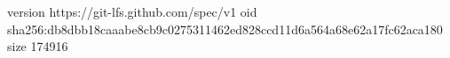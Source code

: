 version https://git-lfs.github.com/spec/v1
oid sha256:db8dbb18caaabe8cb9c0275311462ed828ccd11d6a564a68e62a17fc62aca180
size 174916
